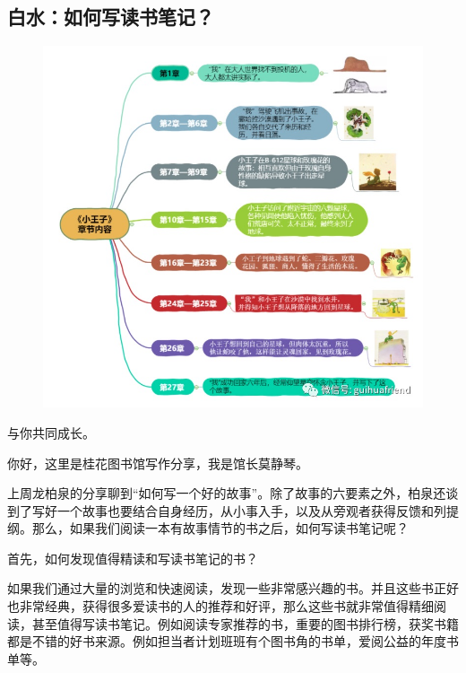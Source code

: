 \vspace{10pt}

{\centering\subsection*{白水：如何写读书笔记？}}


\renewcommand{\leftmark}{白水：如何写读书笔记？}

\begin{figure}[htbp]

\centering

\includegraphics[width = .5\textwidth]{./ch/v7.jpg}

\end{figure}


与你共同成长。



你好，这里是桂花图书馆写作分享，我是馆长莫静琴。



上周龙柏泉的分享聊到“如何写一个好的故事”。除了故事的六要素之外，柏泉还谈到了写好一个故事也要结合自身经历，从小事入手，以及从旁观者获得反馈和列提纲。那么，如果我们阅读一本有故事情节的书之后，如何写读书笔记呢？



首先，如何发现值得精读和写读书笔记的书？



如果我们通过大量的浏览和快速阅读，发现一些非常感兴趣的书。并且这些书正好也非常经典，获得很多爱读书的人的推荐和好评，那么这些书就非常值得精细阅读，甚至值得写读书笔记。例如阅读专家推荐的书，重要的图书排行榜，获奖书籍都是不错的好书来源。例如担当者计划班班有个图书角的书单，爱阅公益的年度书单等。







